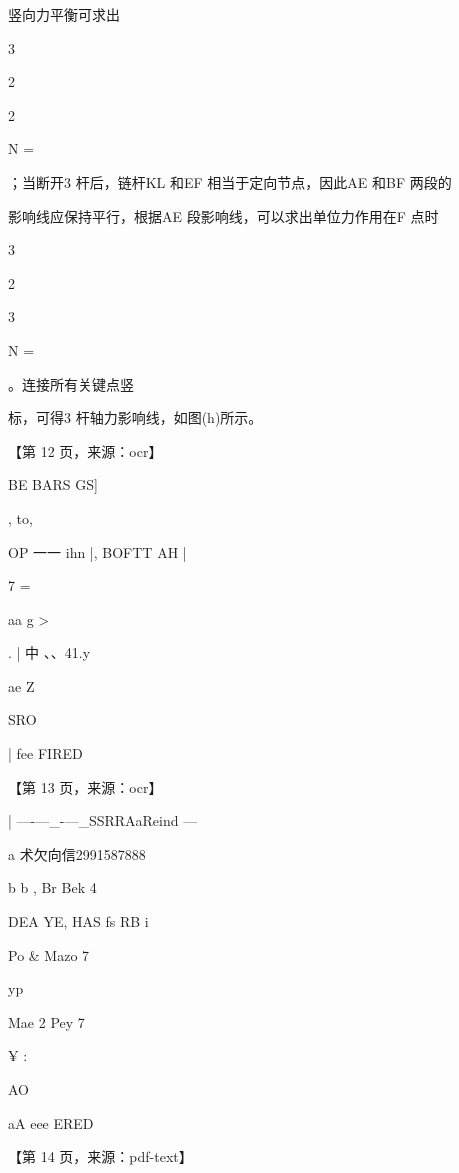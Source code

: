 \documentclass[UTF8,12pt,a4paper,openany]{ctexbook}
\begin{document}
\begin{enumerate}[label=\textbf{\arabic*.},leftmargin=2em]
竖向力平衡可求出\par 3\par 2\par 2\par N =\par ；当断开3 杆后，链杆KL 和EF 相当于定向节点，因此AE 和BF 两段的\par 影响线应保持平行，根据AE 段影响线，可以求出单位力作用在F 点时\par 3\par 2\par 3\par N =\par 。连接所有关键点竖\par 标，可得3 杆轴力影响线，如图(h)所示。\par \par 【第 12 页，来源：ocr】\par BE BARS GS]\par ,     to,\par OP 一一           ihn |, BOFTT AH         |\par 7                 =\par aa         g        >\par .                        |        中                                   、、41.y\par ae Z\par SRO\par |                                     fee FIRED\par \par 【第 13 页，来源：ocr】\par |     —-—\_-—\_SSRRAaReind —\par a       术欠向信2991587888\par b             b             ,       Br Bek 4\par DEA YE, HAS fs RB        i\par Po \& Mazo                            7\par yp\par Mae 2 Pey                     7\par ¥                                                          :\par AO\par aA eee ERED\par \par 【第 14 页，来源：pdf-text】

\end{enumerate}
\end{document}
